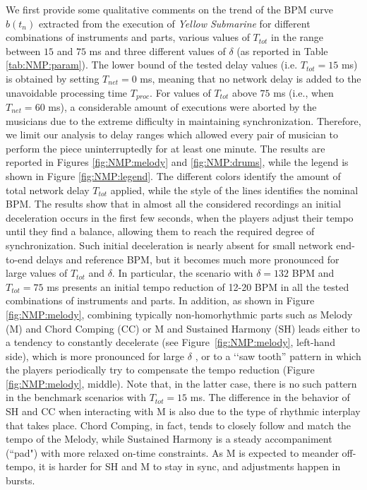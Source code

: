 We first provide some qualitative comments on the trend of the BPM curve $b(t_n)$ extracted from the execution of \textit{ Yellow Submarine} for different combinations of instruments and parts, various values of $T_{tot}$ in the range between $15$ and $75$ ms and three different values of $\delta$ (as reported in Table \ref{tab:NMP:param}). The lower bound of the tested delay values (i.e. $T_{tot}=15$ ms) is obtained by setting $T_{net}=0$ ms, meaning that no network delay is added to the unavoidable processing time $T_{proc}$. For values of $T_{tot}$ above $75$ ms (i.e., when $T_{net}=60$ ms), a considerable amount of executions were aborted by the musicians due to the extreme difficulty in maintaining synchronization. Therefore, we limit our analysis to delay ranges which allowed every pair of musician to perform the piece uninterruptedly for at least one minute.
The results are reported in Figures \ref{fig:NMP:melody} and \ref{fig:NMP:drums}, while the legend is shown in Figure  \ref{fig:NMP:legend}. The different colors identify the amount of total network delay $T_{tot}$ applied, while the style of the lines identifies the nominal BPM. The results show that in almost all the considered recordings an initial deceleration occurs in the first few seconds, when the players adjust their tempo until they find a balance, allowing them to reach the required degree of synchronization. Such initial deceleration is nearly absent for small network end-to-end delays and reference BPM, but it becomes much more pronounced for large values of $T_{tot}$ and $\delta$. In particular, the scenario with $\delta=132$ BPM and $T_{tot}=75$ ms presents an initial tempo reduction of 12-20 BPM in all the tested combinations of instruments and parts.
In addition, as shown in Figure \ref{fig:NMP:melody}, combining typically non-homorhythmic parts such as Melody (M) and Chord Comping (CC) or M and Sustained Harmony (SH) leads either to a tendency to constantly decelerate (see Figure~\ref{fig:NMP:melody}, left-hand side), which is more pronounced for large $\delta$ , or to a \lq\lq saw tooth'' pattern in which the players periodically try to compensate the tempo reduction (Figure \ref{fig:NMP:melody}, middle). Note that, in the latter case, there is no such pattern in the benchmark scenarios with $T_{tot}=15$ ms. The difference in the behavior of SH and CC when interacting with M is also due to the type of rhythmic interplay that takes place. Chord Comping, in fact, tends to closely follow and match the tempo of the Melody, while Sustained Harmony is a steady accompaniment (``pad") with more relaxed on-time constraints. As M is expected to meander off-tempo, it is harder for SH and M to stay in sync, and adjustments happen in bursts.


